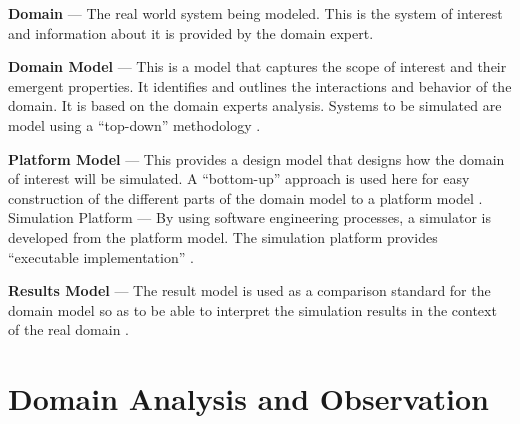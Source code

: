 \documentclass[12pt, a4paper]{report}
\begin{document}
\textbf{Domain} — The real world system being modeled. This is the system of interest and information about it is provided by the domain expert.

 \textbf{Domain Model} — This is a model that captures the scope of interest and their emergent properties. It identiﬁes and outlines the interactions and behavior of the domain\cite{cosmos2011-process}. It is based on the domain experts analysis. Systems to be simulated are model using a “top-down” methodology \cite{Garnett_usingthe}. 
 
 
\textbf{Platform Model} — This provides a design model that designs how the domain of interest will be simulated. A “bottom-up” approach is used here for easy construction of the different parts of the domain model to a platform model \cite{Garnett_usingthe}. Simulation Platform — By using software engineering processes, a simulator is developed from the platform model. The simulation platform provides “executable implementation” \cite{cosmos2011-process}. 

\textbf{Results Model} — The result model is used as a comparison standard for the domain model so as to be able to interpret the simulation results in the context of the real domain \cite{Garnett_usingthe}.

\chapter{Domain Analysis and Observation}


\end{document}
